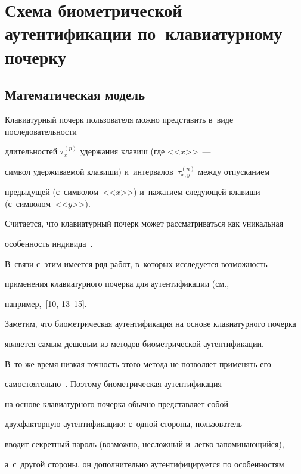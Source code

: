 \section{Схема биометрической аутентификации по~клавиатурному почерку}


\label{biometr}





\subsection{Математическая модель}





Клавиатурный почерк пользователя можно представить в~виде последовательности 


длительностей $\tau^{(p)}_{x}$ удержания клавиш (где <<$x$>>~--- 


символ удерживаемой клавиши) и~интервалов~$\tau^{(n)}_{x,y}$ между отпусканием


 предыдущей (с~символом~<<$x$>>) и~нажатием следующей клавиши (с~символом~<<$y$>>). 


 Считается, что клавиатурный почерк может рассматриваться как уникальная 


 особенность индивида~\cite{Bru2009, Khi2014}.


В~связи с~этим имеется ряд работ, в~которых исследуется возможность 


применения клавиатурного почерка для аутентификации (см., 


например,~[10, 13--15].




Заметим, что биометрическая аутентификация на основе клавиатурного почерка 


является самым дешевым из методов биометрической аутентификации. 


В~то же время низкая точность этого метода не позволяет применять его 


самостоятельно~\cite{Bru2009}. Поэтому биометрическая аутентификация 


на основе клавиатурного почерка обычно представляет собой 


двухфакторную аутентификацию: с~одной стороны, пользователь 


вводит секретный пароль (возможно, несложный и~легко запоминающийся), 


а~с~другой стороны, он дополнительно аутентифицируется по особенностям 


